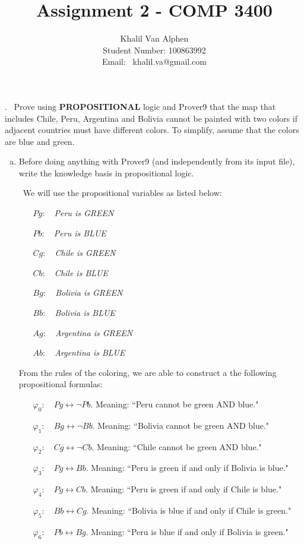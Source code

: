 \documentclass[fullpage]{article}
\title{\vspace*{-2cm}\bf Assignment 2 - COMP 3400}
\author{Khalil Van Alphen\\
Student Number: 100863992\\
Email: \  khalil.va@gmail.com}
\date{}
\begin{document}
\maketitle
\pagestyle{plain}
\thispagestyle{empty}

. \ Prove using {\bf PROPOSITIONAL} logic and Prover9 that the map that includes Chile, Peru, Argentina and Bolivia cannot be painted with two colors if adjacent countries must have different colors. To simplify, assume that the colors are blue and green.\

\begin{enumerate}[(a)]
\item  Before doing anything with Prover9 (and independently from its input file), write the knowledge basis in propositional logic. 

 \ We will use the propositional variables as listed below:
\begin{itemize}
\item[$Pg$:]~ {\em Peru is GREEN}
\item[$Pb$:]~ {\em Peru is BLUE}
\item[$Cg$:]~ {\em Chile is GREEN}
\item[$Cb$:]~ {\em Chile is BLUE}
\item[$Bg$:]~ {\em Bolivia is GREEN}
\item[$Bb$:]~ {\em Bolivia is BLUE}
\item[$Ag$:]~ {\em Argentina is GREEN}
\item[$Ab$:]~ {\em Argentina is BLUE}
\end{itemize}
From the rules of the coloring, we are able to construct a the following propositional formulas:
\begin{itemize}
\item[$\varphi_0$:]~ ${Pg \leftrightarrow \neg Pb}$.
 Meaning: ``Peru cannot be green AND blue."
 \item[$\varphi_1$:]~ ${Bg \leftrightarrow \neg Bb}$.
 Meaning: ``Bolivia cannot be green AND blue."
 \item[$\varphi_2$:]~ ${Cg \leftrightarrow \neg Cb}$.
 Meaning: ``Chile cannot be green AND blue."
\item[$\varphi_3$:]~ ${Pg \leftrightarrow Bb}$.
 Meaning: ``Peru is green if and only if Bolivia is blue."
\item[$\varphi_4$:]~ ${Pg \leftrightarrow Cb}$.
 Meaning: ``Peru is green if and only if Chile is blue."
 \item[$\varphi_5$:]~ ${Bb \leftrightarrow Cg}$.
 Meaning: ``Bolivia is blue if and only if Chile is green."
  \item[$\varphi_6$:]~ ${Pb \leftrightarrow Bg}$.
 Meaning: ``Peru is blue if and only if Bolivia is green."
\end{itemize}


\end{enumerate}
\end{document}
